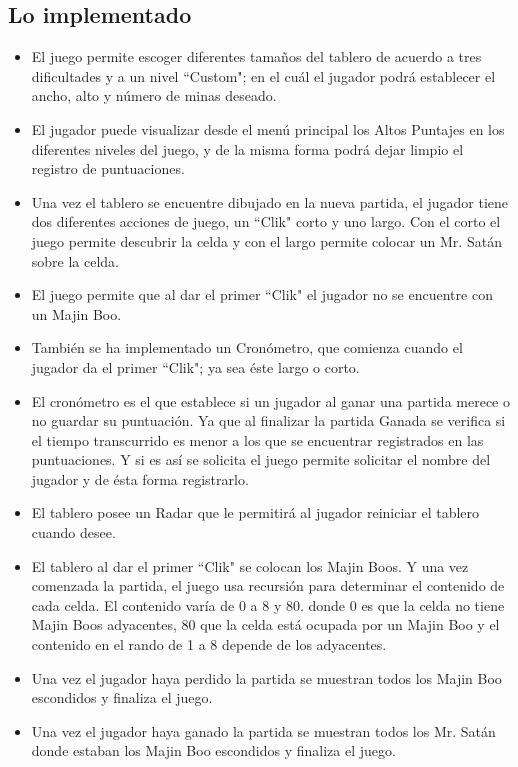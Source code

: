 \documentclass[11pt]{article} %
\begin{document}
\subsection{Lo implementado} 
\begin{itemize}
\item El juego permite escoger diferentes tamaños del tablero de acuerdo a tres dificultades y a un nivel ``Custom"; en el cuál el jugador podrá establecer el ancho, alto y número de minas deseado.
\item El jugador puede visualizar desde el menú principal los Altos Puntajes en los diferentes niveles del juego, y de la misma forma podrá dejar limpio el registro de puntuaciones.
\item Una vez el tablero se encuentre dibujado en la nueva partida, el jugador tiene dos diferentes acciones de juego, un ``Clik" corto y uno largo. Con el corto el juego permite descubrir la celda y con el largo permite colocar un Mr. Satán sobre la celda.
\item El juego permite que al dar el primer ``Clik" el jugador no se encuentre con un Majin Boo.
\item También se ha implementado un Cronómetro, que comienza cuando el jugador da el primer ``Clik"; ya sea éste largo o corto.
\item El cronómetro es el que establece si un jugador al ganar una partida merece o no guardar su puntuación. Ya que al finalizar la partida Ganada se verifica si el tiempo transcurrido es menor a los que se encuentrar registrados en las puntuaciones. Y si es así se solicita el juego permite solicitar el nombre del jugador y de ésta forma registrarlo.
\item El tablero posee un Radar que le permitirá al jugador reiniciar el tablero cuando desee.
\item El tablero al dar el primer ``Clik" se colocan los Majin Boos. Y una vez comenzada la partida, el juego usa recursión para determinar el contenido de cada celda. El contenido varía de 0 a 8 y 80. donde 0 es que la celda no tiene Majin Boos adyacentes, 80 que la celda está ocupada por un Majin Boo y el contenido en el rando de 1 a 8 depende de los adyacentes.
\item Una vez el jugador haya perdido la partida se muestran todos los Majin Boo escondidos y finaliza el juego.
\item Una vez el jugador haya ganado la partida se muestran todos los Mr. Satán donde estaban los Majin Boo escondidos y finaliza el juego.
\end {itemize}
\end{document}
